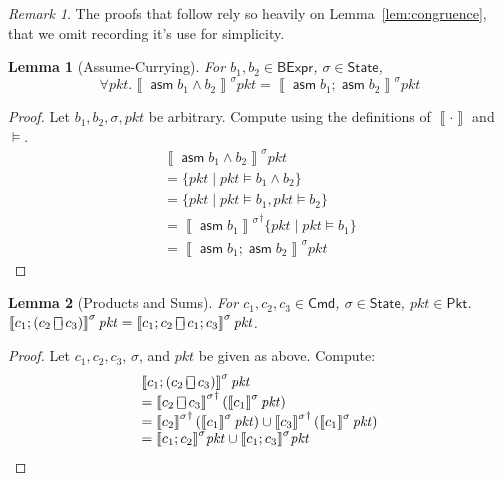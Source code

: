 \documentclass{article}
\newcommand{\pkt}{\mathit{pkt}}
\newcommand{\denote}[1]{\left\llbracket#1\right\rrbracket}
\newcommand{\BExpr}{\mathsf{BExpr}}
\newcommand{\Cmd}{\mathsf{Cmd}}
\newcommand{\Pkt}{\mathsf{Pkt}}
\newcommand{\State}{\mathsf{State}}
\newcommand{\assume}{\mathop{\mathsf{asm}}}
\newcommand{\choiceop}{\rotatebox[origin=c]{90}{$\sqsubset\!\!\!\sqsupset$}}
\newcommand{\choice}{\mathbin{\choiceop}}
\theoremstyle{plain}
\newtheorem{lemma}{Lemma}
\theoremstyle{definition}
\theoremstyle{remark}
\newtheorem{remark}{Remark}
\begin{document}
\begin{remark}
  The proofs that follow rely so heavily on Lemma~\ref{lem:congruence}, that we omit recording it's use for simplicity.
\end{remark}

\begin{lemma}[Assume-Currying]
  \label{lem:assume-currying}
  For $b_1,b_2 \in \BExpr$, $\sigma \in \State$,
  \[\forall \pkt. \denote{\assume {b_1\wedge b_2}}^\sigma \pkt = \denote{\assume {b_1};\assume {b_2}}^\sigma \pkt\]
\end{lemma}
\begin{proof}
  Let $b_1,b_2,\sigma, \pkt$ be arbitrary. Compute using the definitions of $\denote\cdot$ and $\models$.
  \[\begin{array}{ll}
  \denote{\assume {b_1 \wedge b_2}}^\sigma \pkt \\
  = \{\pkt \mid \pkt \models b_1 \wedge b_2\} \\
  = \{\pkt \mid \pkt \models b_1, \pkt \models b_2\} \\
  = {\denote{\assume{b_1}}^\sigma}^\dagger\{\pkt \mid \pkt \models b_1\} \\
  = \denote{\assume{b_1}; \assume{b_2}}^\sigma \pkt
  \end{array}\]
\end{proof}


\begin{lemma}[Products and Sums]
  \label{lem:prod-sum}
  For $c_1,c_2, c_3 \in \Cmd$, $\sigma \in \State$, $\pkt \in \Pkt$.
  $\denote{c_1;(c_2 \choice c_3)}^\sigma\pkt = \denote{c_1;c_2 \choice
    c_1;c_3}^\sigma\pkt$.
\end{lemma}
\begin{proof}
  Let $c_1,c_2,c_3$, $\sigma$, and $\pkt$ be given as above. Compute:
  \[
  \begin{array}{ll}
  \denote{c_1;(c_2 \choice c_3)}^\sigma \pkt \\
  = {\denote{c_2 \choice c_3}^\sigma}^\dagger\left(\denote{c_1}^\sigma\pkt\right) \\
  = {\denote{c_2}^\sigma}^\dagger\left(\denote{c_1}^\sigma \pkt\right)
  \cup {\denote{c_3}^\sigma}^\dagger\left(\denote{c_1}^\sigma \pkt\right) \\
  = {\denote{c_1;c_2}^\sigma}\pkt\cup {\denote{c_1;c_3}^\sigma}\pkt
  \end{array}
  \]
\end{proof}
\end{document}
